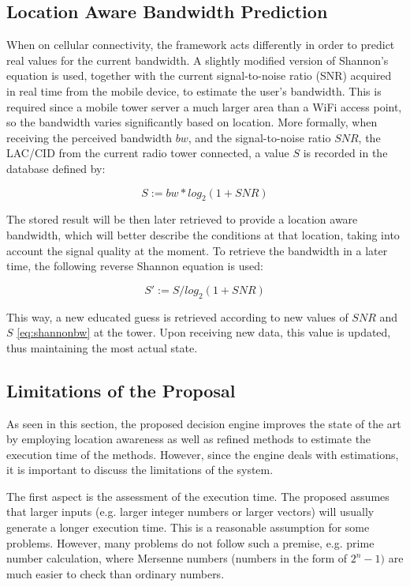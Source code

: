\documentclass[10pt, conference, letterpaper]{IEEEtran}
\begin{document}
\subsection{Location Aware Bandwidth Prediction}

  When on cellular connectivity, the framework acts differently in order to predict real values for the current bandwidth. A slightly modified version of Shannon's equation is used, together with the current signal-to-noise ratio (SNR) acquired in real time from the mobile device, to estimate the user's bandwidth. This is required since a mobile tower server a much larger area than a WiFi access point, so the bandwidth varies significantly based on location. More formally, when receiving the perceived bandwidth $bw$, and the signal-to-noise ratio $SNR$, the LAC/CID from the current radio tower connected, a value $S$ is recorded in the database defined by:

  \begin{equation} \label{eq:shannonbw}
    S := bw * log_2(1 + SNR)
  \end{equation}

  The stored result will be then later retrieved to provide a location aware bandwidth, which will better describe the conditions at that location, taking into account the signal quality at the moment. To retrieve the bandwidth in a later time, the following reverse Shannon equation is used:

  \begin{equation} \label{eq:shannonbw_reverse}
    S' := S / log_2(1 + SNR)
  \end{equation}

  This way, a new educated guess is retrieved according to new values of $SNR$ and $S$ \ref{eq:shannonbw} at the tower. Upon receiving new data, this value is updated, thus maintaining the most actual state.
  
\subsection{Limitations of the Proposal}

As seen in this section, the proposed decision engine improves the state of the art by employing location awareness as well as refined methods to estimate the execution time of the methods. However, since the engine deals with estimations, it is important to discuss the limitations of the system.

The first aspect is the assessment of the execution time. The proposed assumes that larger inputs (e.g. larger integer numbers or larger vectors) will usually generate a longer execution time. This is a reasonable assumption for some problems. However, many problems do not follow such a premise, e.g. prime number calculation, where Mersenne  numbers (numbers in the form of $2^n-1)$ are much easier to check than ordinary numbers. 
\end{document}
